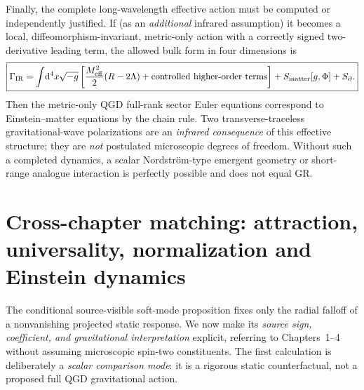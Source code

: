 \documentclass[11pt,a4paper]{article}
\theoremstyle{remark}\newtheorem{remark}[theorem]{Remark}
\newcommand{\dd}{\mathrm d}\newcommand{\Tr}{\operatorname{Tr}}\newcommand{\cO}{\mathcal O}\newcommand{\cG}{\mathcal G}\newcommand{\cH}{\mathcal H}\newcommand{\cE}{\mathcal E}\newcommand{\cK}{\mathcal K}\newcommand{\AX}{\textsf{[AXIOM]}}\newcommand{\D}{\textsf{[DERIVED]}}\newcommand{\C}{\textsf{[CONDITIONAL]}}\newcommand{\OPEN}{\textsf{[OPEN]}}
\begin{document}
Finally, the complete long-wavelength effective action must be computed or independently justified. If (as an \emph{additional} infrared assumption) it becomes a local, diffeomorphism-invariant, metric-only action with a correctly signed two-derivative leading term, the allowed bulk form in four dimensions is
\begin{equation}\label{eq:eh}
\boxed{\Gamma_{\rm IR}=\int\!\dd^4x\sqrt{-g}\left[\frac{M_{\rm eff}^2}{2}(R-2\Lambda)+\text{controlled higher-order terms}\right]+S_{\rm matter}[g,\Phi]+S_{\partial}.}
\end{equation}
Then the metric-only QGD full-rank sector Euler equations correspond to Einstein--matter equations by the chain rule. Two transverse-traceless gravitational-wave polarizations are an \emph{infrared consequence} of this effective structure; they are \emph{not} postulated microscopic degrees of freedom. Without such a completed dynamics, a scalar Nordstr\"om-type emergent geometry or short-range analogue interaction is perfectly possible and does not equal GR.

\section{Cross-chapter matching: attraction, universality, normalization and Einstein dynamics}\label{sec:v22-match}
The conditional source-visible soft-mode proposition fixes only the radial falloff of a nonvanishing projected static response. We now make its \emph{source sign, coefficient, and gravitational interpretation} explicit, referring to Chapters~1--4 without assuming microscopic spin-two constituents. The first calculation is deliberately a \emph{scalar comparison mode}: it is a rigorous static counterfactual, not a proposed full QGD gravitational action.
\end{document}
